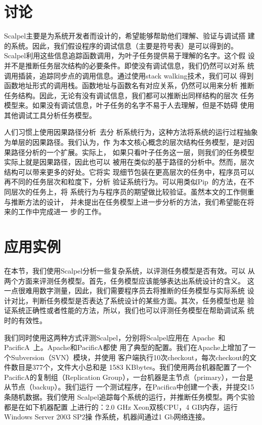 \section{讨论}
\label{sec:scp:discussion}

Scalpel主要是为系统开发者而设计的，希望能够帮助他们理解、验证与调试搭
建的系统。因此，我们假设程序的调试信息（主要是符号表）是可以得到的。
Scalpel利用这些信息追踪函数调用，为叶子任务提供易于理解的名字。这个假
设并不是推断任务层次结构的必要条件。即使没有调试信息，我们仍然可以对系
统调用插装，追踪同步点的调用信息。通过使用stack walking技术，我们可以
得到函数地址形式的调用栈。函数地址与函数名有对应关系，仍然可以用来分析
推断任务结构。因此，无论有没有调试信息，我们都可以推断出同样结构的层次
任务模型来。如果没有调试信息，叶子任务的名字不易于人去理解，但是不妨碍
使用其他调试工具分析任务模型。

人们习惯上使用因果路径分析~\cite{pinpoint, project5, pip, magpie}去分
析系统行为，这种方法将系统的运行过程抽象为单层的因果路径。我们认为，作
为本文核心概念的层次结构任务模型，是对因果路径分析的一个扩展。实际上，
如果只看叶子任务这一层，则我们的任务模型实际上就是因果路径，因此也可以
被用在类似的基于路径的分析中。然而，层次结构可以带来更多的好处。它将实
现细节包装在更高层次的任务中，程序员可以再不同的任务层次和粒度下，分析
验证系统行为。可以用类似Pip~\cite{pip}的方法，在不同层次的任务上，将
系统行为与程序员的期望做比较验证。虽然本文的工作侧重与推断方法的设计，
并未提出在任务模型上进一步分析的方法，我们希望能在将来的工作中完成进一
步的工作。


\section{应用实例}
\label{sec:scp:case}

在本节，我们使用Scalpel分析一些复杂系统，以评测任务模型是否有效。可以
从两个方面来评测任务模型。首先，任务模型应该能够表达出系统设计的含义。
这一点很难用数字测量，因此，我们需要程序员去将推断的任务模型与实际系统
设计对比，判断任务模型是否表达了系统设计的某些方面。其次，任务模型也是
验证系统正确性或者性能的方法，所以，我们也可以评测任务模型在帮助调试系
统时的有效性。

我们同时使用这两种方式评测Scalpel，分别将Scalpel应用在
Apache~\cite{apache}和PacificA~\cite{pacifica}上。Apache和PacificA都使
用了典型的配置。我们在Apache上增加了一个Subversion（SVN）模块，并使用
客户端执行10次checkout，每次checkout的文件数目是377个，文件大小总和是
1583 KBbytes。我们使用两台机器配置了一个PacificA的复制组（Replication
Group），一台机器是主节点（primary），一台是从节点（backup）。我们运行
一个测试程序，在Pacifica中创建一个表，并提交15条随机数据。我们使用
Scalpel追踪每个系统的运行，并推断任务模型。两个实验都是在如下机器配置
上进行的：2.0 GHz Xeon双核CPU，4 GB内存，运行Windows Server 2003 SP2操
作系统，机器间通过1 Gb网络连接。

